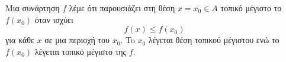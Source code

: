Μια συνάρτηση $ f $ λέμε ότι παρουσιάζει στη θέση $ x=x_0\in A $ τοπικό μέγιστο το $ f(x_0) $ όταν ισχύει
\[ f(x)\leq f(x_0) \]
για κάθε $ x $ σε μια περιοχή του $ x_0 $. To $ x_0 $ λέγεται θέση τοπικού μέγιστου ενώ το $ f(x_0) $ λέγεται τοπικό μέγιστο της $ f $.
